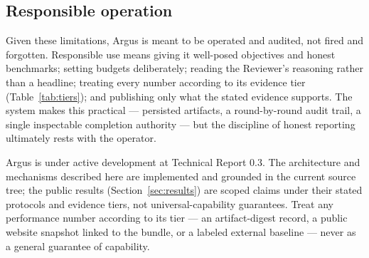 \subsection{Responsible operation}

Given these limitations, Argus is meant to be operated and audited, not fired and
forgotten. Responsible use means giving it well-posed objectives and honest
benchmarks; setting budgets deliberately; reading the Reviewer's reasoning rather
than a headline; treating every number according to its evidence tier
(Table~\ref{tab:tiers}); and publishing only what the stated evidence supports. The
system makes this practical --- persisted artifacts, a round-by-round audit trail, a
single inspectable completion authority --- but the discipline of honest reporting
ultimately rests with the operator.

\begin{callout}[Maturity]
Argus is under active development at Technical Report 0.3. The architecture and
mechanisms described here are implemented and grounded in the current source tree;
the public results (Section~\ref{sec:results}) are scoped claims under their stated
protocols and evidence tiers, not universal-capability guarantees. Treat any
performance number according to its tier --- an artifact-digest record, a
public website snapshot linked to the bundle, or a labeled external baseline ---
never as a general guarantee of capability.
\end{callout}
